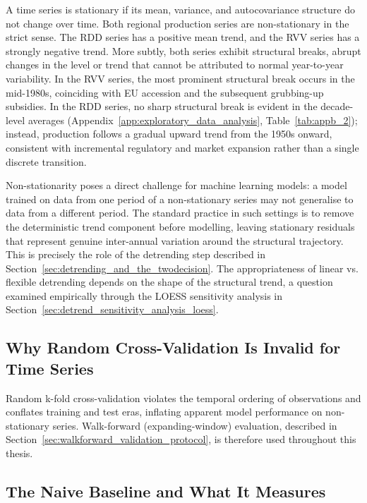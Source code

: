 A time series is stationary if its mean, variance, and autocovariance structure do not change over time. Both regional production series are non-stationary in the strict sense. The RDD series has a positive mean trend, and the RVV series has a strongly negative trend. More subtly, both series exhibit structural breaks, abrupt changes in the level or trend that cannot be attributed to normal year-to-year variability. In the RVV series, the most prominent structural break occurs in the mid-1980s, coinciding with EU accession and the subsequent grubbing-up subsidies. In the RDD series, no sharp structural break is evident in the decade-level averages (Appendix~\ref{app:exploratory_data_analysis}, Table~\ref{tab:appb_2}); instead, production follows a gradual upward trend from the 1950s onward, consistent with incremental regulatory and market expansion rather than a single discrete transition.

Non-stationarity poses a direct challenge for machine learning models: a model trained on data from one period of a non-stationary series may not generalise to data from a different period. The standard practice in such settings is to remove the deterministic trend component before modelling, leaving stationary residuals that represent genuine inter-annual variation around the structural trajectory. This is precisely the role of the detrending step described in Section~\ref{sec:detrending_and_the_twodecision}. The appropriateness of linear vs. flexible detrending depends on the shape of the structural trend, a question examined empirically through the LOESS sensitivity analysis in Section~\ref{sec:detrend_sensitivity_analysis_loess}.


\subsection{Why Random Cross-Validation Is Invalid for Time Series}\label{sub:why_random_crossvalidation_is}

Random k-fold cross-validation violates the temporal ordering of observations and conflates training and test eras, inflating apparent model performance on non-stationary series. Walk-forward (expanding-window) evaluation, described in Section~\ref{sec:walkforward_validation_protocol}, is therefore used throughout this thesis.


\subsection{The Naive Baseline and What It Measures}\label{sub:the_naive_baseline_and}

